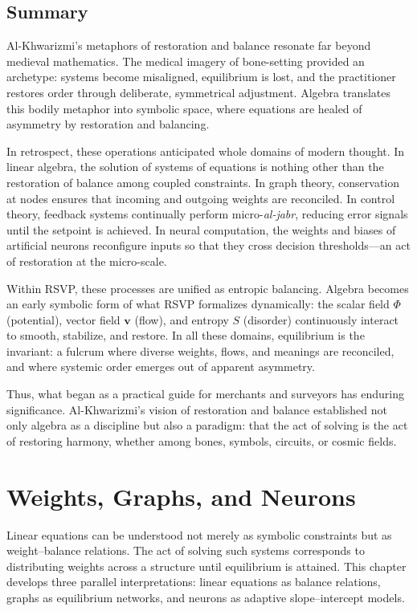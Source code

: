 \documentclass[a4paper,11pt,openany]{book}
\begin{document}
\section{Summary}

Al-Khwarizmi’s metaphors of restoration and balance resonate far beyond medieval 
mathematics. The medical imagery of bone-setting provided an archetype: systems become 
misaligned, equilibrium is lost, and the practitioner restores order through deliberate, 
symmetrical adjustment. Algebra translates this bodily metaphor into symbolic space, where 
equations are healed of asymmetry by restoration and balancing.

In retrospect, these operations anticipated whole domains of modern thought. In linear 
algebra, the solution of systems of equations is nothing other than the restoration of balance 
among coupled constraints. In graph theory, conservation at nodes ensures that incoming and 
outgoing weights are reconciled. In control theory, feedback systems continually perform 
micro-\emph{al-jabr}, reducing error signals until the setpoint is achieved. In neural 
computation, the weights and biases of artificial neurons reconfigure inputs so that they cross 
decision thresholds—an act of restoration at the micro-scale. 

Within RSVP, these processes are unified as entropic balancing. Algebra becomes an early 
symbolic form of what RSVP formalizes dynamically: the scalar field $\Phi$ (potential), vector 
field $\mathbf{v}$ (flow), and entropy $S$ (disorder) continuously interact to smooth, 
stabilize, and restore. In all these domains, equilibrium is the invariant: a fulcrum where 
diverse weights, flows, and meanings are reconciled, and where systemic order emerges out of 
apparent asymmetry.

Thus, what began as a practical guide for merchants and surveyors has enduring significance. 
Al-Khwarizmi’s vision of restoration and balance established not only algebra as a discipline 
but also a paradigm: that the act of solving is the act of restoring harmony, whether among 
bones, symbols, circuits, or cosmic fields.

\chapter{Weights, Graphs, and Neurons}

Linear equations can be understood not merely as symbolic constraints but as 
weight–balance relations. The act of solving such systems corresponds to distributing 
weights across a structure until equilibrium is attained. This chapter develops three 
parallel interpretations: linear equations as balance relations, graphs as equilibrium 
networks, and neurons as adaptive slope–intercept models.
\end{document}
